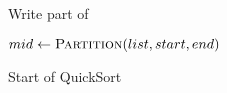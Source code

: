 \begin{homeworkProblem}
  Write part of 

  \begin{algorithm}[]
      \begin{algorithmic}[1]
                  \State{} \Return{}
              \EndIf{}
              \State{} $mid \gets \Call{Partition}{list, start, end}$
              \State{} 
              \State{} 
          \EndFunction{}
      \end{algorithmic}
      \caption{Start of QuickSort}
  \end{algorithm}
\end{homeworkProblem}